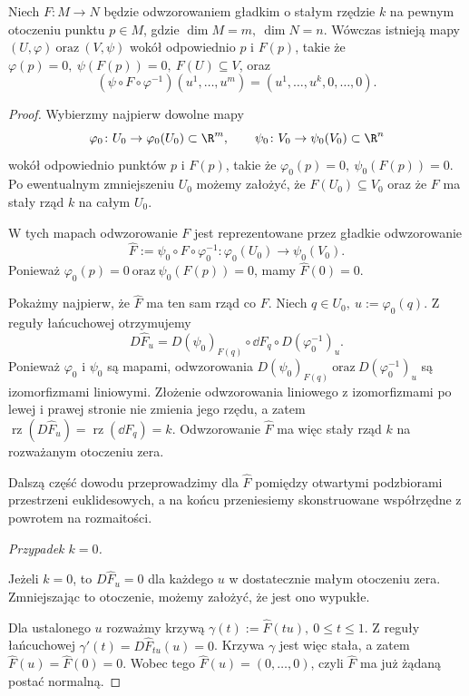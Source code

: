 \begin{twierdzenie}
\label{tw:rzad-staly}
Niech $F\colon M\to N$
będzie odwzorowaniem gładkim o stałym rzędzie $k$ na pewnym otoczeniu
punktu $p\in M$, gdzie $\dim M=m, \ \dim N=n$.
Wówczas istnieją mapy $(U,\varphi) \ \text{oraz}\ (V,\psi)$
wokół odpowiednio $p$ i $F(p)$, takie że $\varphi(p)=0, \ \psi(F(p))=0, \ F(U)\subseteq V$,
oraz
\[
(\psi\circ F\circ\varphi^{-1})(u^1,\dots,u^m)
=
(u^1,\dots,u^k,0,\dots,0).
\]
\end{twierdzenie}
\begin{proof}
Wybierzmy najpierw dowolne mapy
\[
\varphi_0\colon U_0\to\varphi_0(U_0)\subset\R^m, \qquad \psi_0\colon V_0\to\psi_0(V_0)\subset\R^n
\]
wokół odpowiednio punktów $p$ i $F(p)$, takie że $\varphi_0(p)=0, \ \psi_0(F(p))=0$.
Po ewentualnym zmniejszeniu $U_0$ możemy założyć, że $F(U_0)\subseteq V_0$
oraz że $F$ ma stały rząd $k$ na całym $U_0$.

W tych mapach odwzorowanie $F$ jest reprezentowane przez gładkie
odwzorowanie
\[
\widehat F := \psi_0\circ F\circ\varphi_0^{-1} \colon \varphi_0(U_0)\longrightarrow\psi_0(V_0).
\]
Ponieważ $\varphi_0(p)=0 \ \text{oraz}\ \psi_0(F(p))=0$,
mamy $\widehat F(0)=0$.

Pokażmy najpierw, że $\widehat F$ ma ten sam rząd co $F$.
Niech $q\in U_0, \ u:=\varphi_0(q)$.
Z reguły łańcuchowej otrzymujemy
\[
D\widehat F_u = D(\psi_0)_{F(q)} \circ \dd F_q \circ D(\varphi_0^{-1})_u.
\]
Ponieważ $\varphi_0$ i $\psi_0$ są mapami, odwzorowania $D(\psi_0)_{F(q)} \ \text{oraz}\ D(\varphi_0^{-1})_u$
są izomorfizmami liniowymi. Złożenie odwzorowania liniowego
z izomorfizmami po lewej i prawej stronie nie zmienia jego rzędu,
a zatem $\operatorname{rz}(D\widehat F_u) = \operatorname{rz}(\dd F_q) = k$.
Odwzorowanie $\widehat F$ ma więc stały rząd $k$ na rozważanym
otoczeniu zera.

Dalszą część dowodu przeprowadzimy dla $\widehat F$ pomiędzy
otwartymi podzbiorami przestrzeni euklidesowych, a na końcu
przeniesiemy skonstruowane współrzędne z powrotem na rozmaitości.

\medskip
\emph{Przypadek $k=0$.}

Jeżeli $k=0$, to $D\widehat F_u=0$
dla każdego $u$ w dostatecznie małym otoczeniu zera.
Zmniejszając to otoczenie, możemy założyć, że jest ono wypukłe.

Dla ustalonego $u$ rozważmy krzywą $\gamma(t):=\widehat F(tu), \ 0\leq t\leq1$.
Z reguły łańcuchowej $\gamma'(t) = D\widehat F_{tu}(u) = 0$.
Krzywa $\gamma$ jest więc stała, a zatem $\widehat F(u) = \widehat F(0) = 0$.
Wobec tego $\widehat F(u)=(0,\dots,0)$,
czyli $\widehat F$ ma już żądaną postać normalną.


\end{proof}
